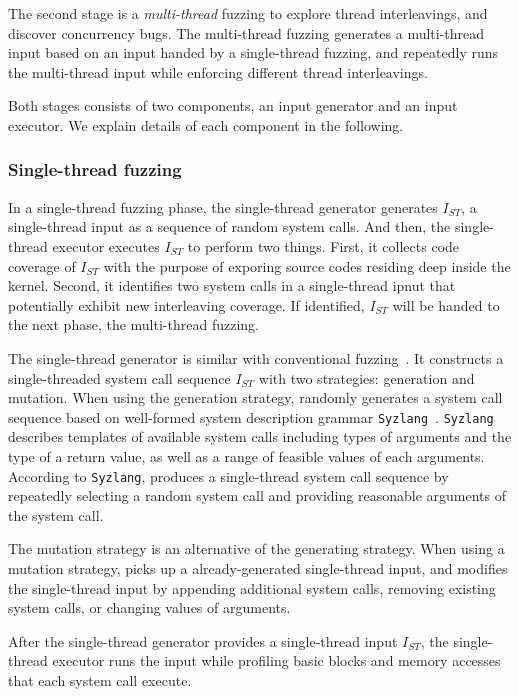 The second stage is a \textit{multi-thread} fuzzing to explore thread
interleavings, and discover concurrency bugs.
%
The multi-thread fuzzing generates a multi-thread input based on an
input handed by a single-thread fuzzing, and repeatedly runs the
multi-thread input while enforcing different thread interleavings.


Both stages consists of two components, an input generator and an
input executor. We explain details of each component in the following.


\subsubsection{Single-thread fuzzing}
%
In a single-thread fuzzing phase, the single-thread generator
generates $I_{ST}$, a single-thread input as a sequence of random
system calls.
%
And then, the single-thread executor executes $I_{ST}$ to perform two
things. First, it collects code coverage of $I_{ST}$ with the purpose
of exporing source codes residing deep inside the kernel. Second, it
identifies two system calls in a single-thread ipnut that potentially
exhibit new interleaving coverage.
%
If identified, $I_{ST}$ will be handed to the next phase, the
multi-thread fuzzing.


%
The single-thread generator is similar with conventional
fuzzing~\cite{syzkaller}.
%
It constructs a single-threaded system call sequence $I_{ST}$ with two
strategies: generation and mutation.
%
When using the generation strategy, \sys randomly generates a system
call sequence based on well-formed system description grammar
\texttt{Syzlang}~\cite{syzlang}.
%
\texttt{Syzlang} describes templates of available system calls
including types of arguments and the type of a return value, as well
as a range of feasible values of each arguments.
%
According to \texttt{Syzlang}, \sys produces a single-thread system
call sequence by repeatedly selecting a random system call and
providing reasonable arguments of the system call.

The mutation strategy is an alternative of the generating strategy.
When using a mutation strategy, \sys picks up a already-generated
single-thread input, and modifies the single-thread input by appending
additional system calls, removing existing system calls, or changing
values of arguments.


%
After the single-thread generator provides a single-thread input
$I_{ST}$, the single-thread executor runs the input while profiling
basic blocks and memory accesses that each system call execute.

